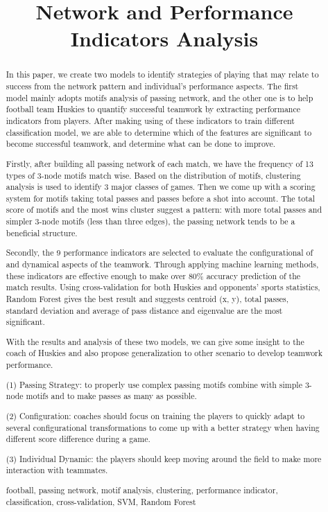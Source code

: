 \documentclass{mcmthesis}
\title{Network and Performance Indicators Analysis}
\author{
  }
\begin{document}
\begin{abstract}

In this paper, we create two models to identify strategies of playing that may relate to success from the network pattern and individual’s performance aspects. The first model mainly adopts motifs analysis of passing network, and the other one is to help football team Huskies to quantify successful teamwork by extracting performance indicators from players. After making using of these indicators to train different classification model, we are able to determine which of the features are significant to become successful teamwork, and determine what can be done to improve.

Firstly, after building all passing network of each match, we have the frequency of 13 types of 3-node motifs match wise. Based on the distribution of motifs, clustering analysis is used to identify 3 major classes of games. Then we come up with a scoring system for motifs taking total passes and passes before a shot into account. The total score of motifs and the most wins cluster suggest a pattern: with more total passes and simpler 3-node motifs (less than three edges), the passing network tends to be a beneficial structure.

Secondly, the 9 performance indicators are selected to evaluate the configurational of and dynamical aspects of the teamwork. Through applying machine learning methods, these indicators are effective enough to make over 80\% accuracy prediction of the match results. Using cross-validation for both Huskies and opponents’ sports statistics, Random Forest gives the best result and suggests centroid (x, y), total passes, standard deviation and average of pass distance and eigenvalue are the most significant.

With the results and analysis of these two models, we can give some insight to the coach of Huskies and also propose generalization to other scenario to develop teamwork performance.

\indent(1) Passing Strategy: to properly use complex passing motifs combine with simple 3-node motifs and to make passes as many as possible.

\indent(2) Configuration: coaches should focus on training the players to quickly adapt to several configurational transformations to come up with a better strategy when having different score difference during a game.

\indent(3) Individual Dynamic: the players should keep moving around the field to make more interaction with teammates.


\begin{keywords}
football, passing network, motif analysis, clustering, performance indicator, classification, cross-validation, SVM, Random Forest
\end{keywords}
\end{abstract}
\maketitle
\end{document}

